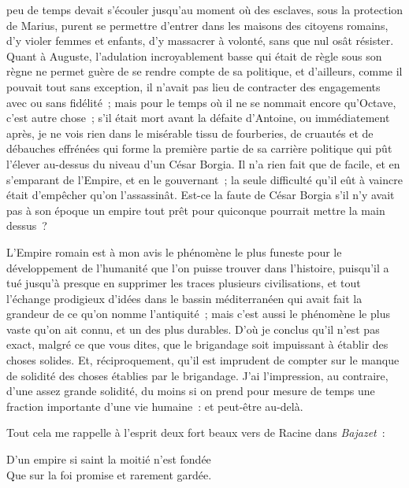 \documentclass[french,twoside]{book} %
\newenvironment{quoteblock}%
  {\begin{quoting}}
  {\end{quoting}}
\newenvironment{quotebar}{%
    \def\FrameCommand{{\color{rubric!10!}\vrule width 0.5em} \hspace{0.9em}}%
    \def\OuterFrameSep{\itemsep} %
    \MakeFramed {\advance\hsize-\width \FrameRestore}
  }%
  {%
    \endMakeFramed
  }
\renewenvironment{quoteblock}%
  {%
    \savenotes
    \setstretch{0.9}
    \normalfont
    \begin{quotebar}
  }
  {%
    \end{quotebar}
    \spewnotes
  }
\begin{document}
peu de temps devait s'écouler jusqu'au moment où des esclaves, sous la protection de Marius, purent se permettre d'entrer dans les maisons des citoyens romains, d'y violer femmes et enfants, d'y massacrer à volonté, sans que nul osât résister. Quant à Auguste, l'adulation incroyablement basse qui était de règle sous son règne ne permet guère de se rendre compte de sa politique, et d'ailleurs, comme il pouvait tout sans exception, il n'avait pas lieu de contracter des engagements avec ou sans fidélité ; mais pour le temps où il ne se nommait encore qu'Octave, c'est autre chose ; s'il était mort avant la défaite d'Antoine, ou immédiatement après, je ne vois rien dans le misérable tissu de fourberies, de cruautés et de débauches effrénées qui forme la première partie de sa carrière politique qui pût l'élever au-dessus du niveau d'un César Borgia. Il n'a rien fait que de facile, et en s'emparant de l'Empire, et en le gouvernant ; la seule difficulté qu'il eût à vaincre était d'empêcher qu'on l'assassinât. Est-ce la faute de César Borgia s'il n'y avait pas à son époque un empire tout prêt pour quiconque pourrait mettre la main dessus ?\par
L'Empire romain est à mon avis le phénomène le plus funeste pour le développement de l'humanité que l'on puisse trouver dans l'histoire, puisqu'il a tué jusqu'à presque en supprimer les traces plusieurs civilisations, et tout l'échange prodigieux d'idées dans le bassin méditerranéen qui avait fait la grandeur de ce qu'on nomme l’antiquité ; mais c'est aussi le phénomène le plus vaste qu'on ait connu, et un des plus durables. D'où je conclus qu'il n'est pas exact, malgré ce que vous dites, que le brigandage soit impuissant à établir des choses solides. Et, réciproquement, qu'il est imprudent de compter sur le manque de solidité des choses établies par le brigandage. J'ai l'impression, au contraire, d'une assez grande solidité, du moins si on prend pour mesure de temps une fraction importante d'une vie humaine : et peut-être au-delà.\par
Tout cela me rappelle à l'esprit deux fort beaux vers de Racine dans {\itshape Bajazet} :\par

\begin{quoteblock}
 \noindent D'un empire si saint la moitié n'est fondée \\
Que sur la foi promise et rarement gardée.
 \end{quoteblock}
\end{document}
